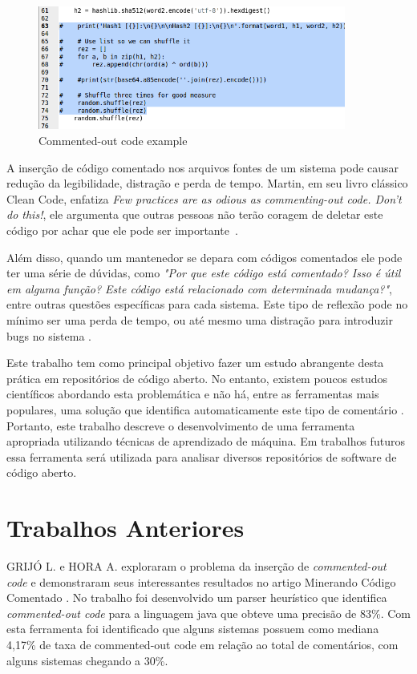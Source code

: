 \documentclass[12pt]{article}
\begin{document}
\begin{figure}[ht]
  \centering
  \includegraphics[width=0.9\textwidth]{../images/gcc06.png}
  \caption{Commented-out code example }
  \label{fig:commentExample}
\end{figure}


A inserção de código comentado nos arquivos fontes de um sistema pode causar
redução da legibilidade, distração e perda de tempo. Martin, em seu livro clássico
Clean Code, enfatiza \textit{Few practices are as odious as commenting-out code. 
Don’t do this!}, ele argumenta que outras pessoas não terão coragem de deletar 
este código por achar que ele pode ser importante~\cite{cleanCode}. 

Além disso, quando um mantenedor se depara com códigos comentados ele pode ter uma 
série de dúvidas, como \textit{"Por que este código está comentado? Isso é útil em 
alguma função? Este código está relacionado com determinada mudança?"}, entre outras 
questões específicas para cada sistema. Este tipo de reflexão pode no mínimo ser 
uma perda de tempo, ou até mesmo uma distração para introduzir bugs no sistema \cite{cleanCode}.

Este trabalho tem como principal objetivo fazer um estudo abrangente desta prática em repositórios 
de código aberto. No entanto, existem poucos estudos científicos abordando esta problemática e não 
há, entre as ferramentas mais populares, uma solução que identifica automaticamente
este tipo de comentário \cite{articleMiningComments}. Portanto, este trabalho descreve o
desenvolvimento de uma ferramenta apropriada utilizando técnicas de aprendizado de 
máquina. Em trabalhos futuros essa ferramenta será utilizada para analisar diversos
repositórios de software de código aberto. 

\section{Trabalhos Anteriores} \label{sec:prev-works}
GRIJÓ L. e HORA A. exploraram o problema da inserção de \textit{commented-out code}
e demonstraram seus interessantes resultados no artigo Minerando Código Comentado 
\cite{articleMiningComments}. No trabalho foi desenvolvido um parser heurístico
que identifica \textit{commented-out code} para a linguagem java que obteve
uma precisão de 83\%. Com esta ferramenta foi identificado que alguns 
sistemas possuem como mediana 4,17\% de taxa de commented-out code em relação
ao total de comentários, com alguns sistemas chegando a 30\%.
\end{document}
